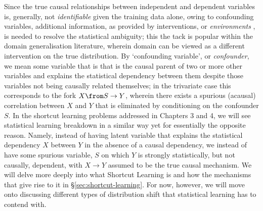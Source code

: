 Since the true causal relationships between independent and dependent variables is, generally, not
\emph{identifiable} given the training data alone, owing to confounding variables, additional
information, as provided by interventions, or \emph{environments} \citep{peters2016causal}, is
needed to resolve the statistical ambiguity; this  the tack is popular within the domain
generalisation literature, wherein domain can be viewed as a different intervention on the true
distribution.
%
By `confounding variable', or \emph{confounder}, we mean some variable that is that is
the causal parent of two or more other variables and explains the statistical dependency between
them despite those variables not being causally related themselves; in the trivariate case this
corresponds to the fork \(X \from S \to Y \), wherein there exists a spurious (acausal) correlation
between \(X\) and \(Y\) that is eliminated by conditioning on the confounder \(S\).
%
In the shortcut learning problems addressed in Chapters 3 and 4, we will see statistical learning
breakdown in a similar way yet for essentially the opposite reason.
%
Namely, instead of having latent variable that explains the statistical dependency \(X\) between
\(Y\) in the absence of a causal dependency, we instead of have some spurious variable, \(S\) on
which \(Y\) is strongly statistically, but not causally, dependent, with \(X \to Y \) assumed to be
the true causal mechanism.
%
We will delve more deeply into what Shortcut Learning is and how the mechanisms that give rise to
it in \S\ref{sec:shortcut-learning}.
%
For now, however, we will move onto discussing different types of distribution shift that
statistical learning has to contend with.



